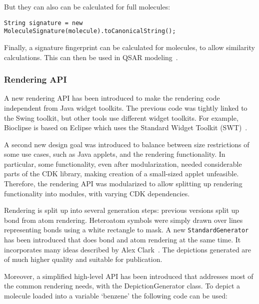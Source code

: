 \documentclass[doublespacing]{bmcart}
\begin{document}
  But they can also can be calculated for full molecules:

\vspace{0.2cm}
\begin{verbatim}
String signature = new MoleculeSignature(molecule).toCanonicalString();
\end{verbatim}
\vspace{0.2cm}

  Finally, a signature fingerprint can be calculated for molecules, to allow
  similarity calculations. This can then be used in QSAR modeling~\cite{Alvarsson2016,
  signaturefingerprints,Spjuth2011DS,Moghadam2015,Alvarsson2014,Spjuth2012OS,Norinder2013}.

  \subsubsection*{Rendering API}

  A new rendering API has been introduced to make the rendering code independent
  from Java widget toolkits. The previous code was tightly linked to the Swing
  toolkit, but other tools use different widget toolkits. For example, Bioclipse
  is based on Eclipse which uses the Standard Widget Toolkit (SWT)~\cite{spjuth2007bioclipse}.
  
  A second new design goal was introduced to balance between size restrictions
  of some use cases, such as Java applets, and the rendering functionality. In
  particular, some functionality, even after modularization, needed considerable
  parts of the CDK library, making creation of a small-sized applet unfeasible.
  Therefore, the rendering API was modularized to allow splitting up rendering
  functionality into modules, with varying CDK dependencies.

  Rendering is split up into several generation steps: previous versions split
  up bond from atom rendering. Heteroatom symbols were simply drawn over lines
  representing bonds using a white rectangle to mask. A new \texttt{StandardGenerator}
  has been introduced that does bond and atom rendering at the same time. It incorporates
  many ideas described by Alex Clark~\cite{Clark10,Clark13}. The depictions generated are of much
  higher quality and suitable for publication.

  
  Moreover, a simplified high-level API has been introduced that addresses most of the
  common rendering needs, with the DepictionGenerator class. To depict a molecule
  loaded into a variable `benzene' the following code can be used:
\end{document}
